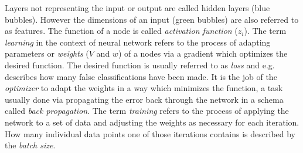 Layers not representing the input or output are called hidden layers ({\color{blue}blue bubbles}). However the dimensions of an input ({\color{green}green bubbles}) are also referred to as features. The function of a node is called \textit{activation function} ($z_i$). The term \textit{learning} in the context of neural network refers to the process of adapting parameters or \textit{weights} ($V$ and $w$) of a nodes via a gradient which optimizes the desired function. The desired function is usually referred to as \textit{loss} and e.g. describes how many false classifications have been made. It is the job of the \textit{optimizer} to adapt the weights in a way which minimizes the function, a task usually done via propagating the error back through the network in a schema called \textit{back propagation}. The term \textit{training} refers to the process of applying the network to a set of data and adjusting the weights as necessary for each iteration. How many individual data points one of those iterations contains is described by the \textit{batch size}.
